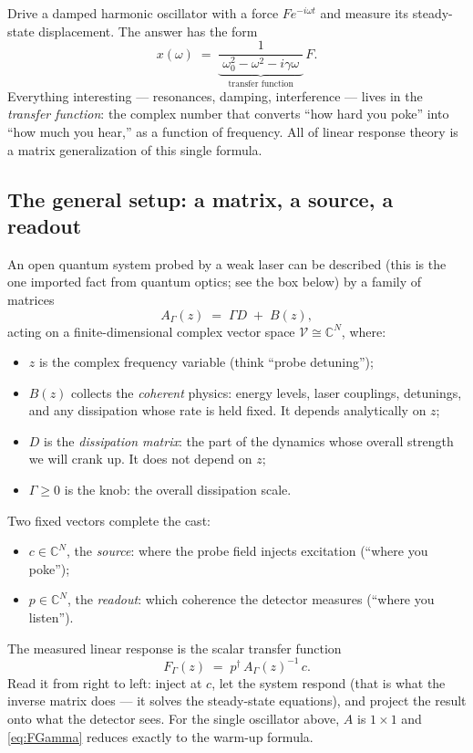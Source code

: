 \documentclass[11pt]{article}
\begin{document}
Drive a damped harmonic oscillator with a force $F e^{-i\omega t}$ and measure
its steady-state displacement.  The answer has the form
\[
x(\omega) \;=\; \underbrace{\frac{1}{\;\omega_0^2-\omega^2-i\gamma\omega\;}}_{\text{transfer function}}\,F .
\]
Everything interesting --- resonances, damping, interference --- lives in the
\emph{transfer function}: the complex number that converts ``how hard you
poke'' into ``how much you hear,'' as a function of frequency.  All of linear
response theory is a matrix generalization of this single formula.

\subsection{The general setup: a matrix, a source, a readout}

An open quantum system probed by a weak laser can be described (this is the
one imported fact from quantum optics; see the box below) by a family of
matrices
\begin{equation}
A_\Gamma(z) \;=\; \Gamma D \;+\; B(z),
\label{eq:AGamma}
\end{equation}
acting on a finite-dimensional complex vector space
$\mathcal V\cong\mathbb C^N$, where:
\begin{itemize}
\item $z$ is the complex frequency variable (think ``probe detuning'');
\item $B(z)$ collects the \emph{coherent} physics: energy levels, laser
couplings, detunings, and any dissipation whose rate is held fixed.  It
depends analytically on $z$;
\item $D$ is the \emph{dissipation matrix}: the part of the dynamics whose
overall strength we will crank up.  It does not depend on $z$;
\item $\Gamma\ge 0$ is the knob: the overall dissipation scale.
\end{itemize}
Two fixed vectors complete the cast:
\begin{itemize}
\item $c\in\mathbb C^N$, the \emph{source}: where the probe field injects
excitation (``where you poke'');
\item $p\in\mathbb C^N$, the \emph{readout}: which coherence the detector
measures (``where you listen'').
\end{itemize}
The measured linear response is the scalar transfer function
\begin{equation}
F_\Gamma(z) \;=\; p^\dagger\, A_\Gamma(z)^{-1}\, c .
\label{eq:FGamma}
\end{equation}
Read it from right to left: inject at $c$, let the system respond
(that is what the inverse matrix does --- it solves the steady-state
equations), and project the result onto what the detector sees.  For the
single oscillator above, $A$ is $1\times 1$ and
\eqref{eq:FGamma} reduces exactly to the warm-up formula.
\end{document}
